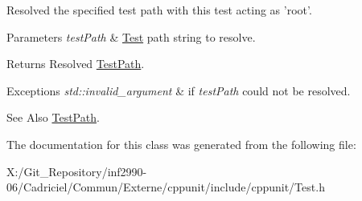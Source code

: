Resolved the specified test path with this test acting as 'root'. 


\begin{DoxyParams}{Parameters}
{\em test\-Path} & \hyperlink{class_test}{Test} path string to resolve. \\
\hline
\end{DoxyParams}
\begin{DoxyReturn}{Returns}
Resolved \hyperlink{class_test_path}{Test\-Path}. 
\end{DoxyReturn}

\begin{DoxyExceptions}{Exceptions}
{\em std\-::invalid\-\_\-argument} & if {\itshape test\-Path} could not be resolved. \\
\hline
\end{DoxyExceptions}
\begin{DoxySeeAlso}{See Also}
\hyperlink{class_test_path}{Test\-Path}. 
\end{DoxySeeAlso}


The documentation for this class was generated from the following file\-:\begin{DoxyCompactItemize}
\item 
X\-:/\-Git\-\_\-\-Repository/inf2990-\/06/\-Cadriciel/\-Commun/\-Externe/cppunit/include/cppunit/Test.\-h\end{DoxyCompactItemize}
